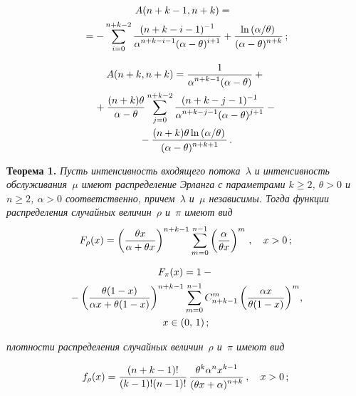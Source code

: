 \begin{multicols}{2}
\noindent
\begin{multline}
\!\!A(n+k-1,n+k)={}\\
{}=-\sum\limits_{i=0}^{n+k-2}\displaystyle\frac{\displaystyle (n+k-i-1)^{-1}\mathstrut}{\displaystyle \alpha^{n+k-i-1}(\alpha-\theta)^{i+1}\mathstrut}+
\displaystyle\frac{\displaystyle \ln \left (\alpha/ \theta\right)\mathstrut}{\displaystyle (\alpha-\theta)^{n+k}\mathstrut}\,;
\label{e6kud}
\end{multline}
\vspace*{-12pt}

\noindent
\begin{multline}
A(n+k,n+k)=\displaystyle\frac{\displaystyle 1\mathstrut}{\displaystyle \alpha^{n+k-1}(\alpha-\theta)\mathstrut}+{}\\
{}+\displaystyle\frac{\displaystyle (n+k)\theta\mathstrut}{\displaystyle \alpha-\theta\mathstrut}\sum\limits_{j=0}^{n+k-2}\displaystyle\frac{\displaystyle (n+k-j-1)^{-1}
\mathstrut}{\displaystyle \alpha^{n+k-j-1}(\alpha-\theta)^{j+1}\mathstrut}-{}\\
{}-
\displaystyle\frac{\displaystyle (n+k)\theta\ln\left (\alpha/\theta\right )\mathstrut}{\displaystyle (\alpha -\theta)^{n+k+1}\mathstrut}\,.
\label{e7kud}
\end{multline}

\smallskip

\noindent
\textbf{Теорема 1.} 
{\it Пусть интенсивность входящего потока~$\lambda$ и интенсивность обслуживания~$\mu$ имеют распределение
Эрланга с параметрами $k\ge2$, $\theta>0$ и $n\ge2$, $\alpha>0$ соответственно, причем~$\lambda$ и~$\mu$ независимы.
Тогда функции распределения случайных величин~$\rho$ и~$\pi$ имеют вид}
\begin{equation*}
F_\rho(x)=\left(\displaystyle\frac{\displaystyle \theta x\mathstrut}{\displaystyle \alpha+\theta x\mathstrut}\right)^{n+k-1}\sum\limits_{m=0}^{n-1}\left(\displaystyle\frac{\displaystyle \alpha\mathstrut}{\displaystyle \theta
x\mathstrut}\right)^m\,,\quad x>0\,;
\end{equation*}
\vspace*{-16pt}

\noindent
\begin{multline*}
F_\pi(x)=1-{}\\
{}-\left(\fr{\theta(1-x)}{\alpha x+\theta(1-x)}\right)^{n+k-1}\sum\limits_{m=0}^{n-1}C_{n+k-1}^m\left(\fr{\alpha
x}{\theta(1-x)}\right)^m\!,\\ %
x\in (0,\,1)\,;
\end{multline*}


\noindent
\textit{плотности распределения случайных величин~$\rho$ и~$\pi$ имеют вид}

\vspace*{3pt}

\noindent
\begin{equation*}
f_\rho(x)=\displaystyle\frac{\displaystyle (n+k-1)!\mathstrut}{\displaystyle (k-1)!(n-1)!\mathstrut}\,\displaystyle\frac{\displaystyle \theta^k\alpha^nx^{k-1}\mathstrut}{\displaystyle (\theta x+\alpha)^{n+k}\mathstrut}\,,\quad x>0\,;
\end{equation*}


\end{multicols}
